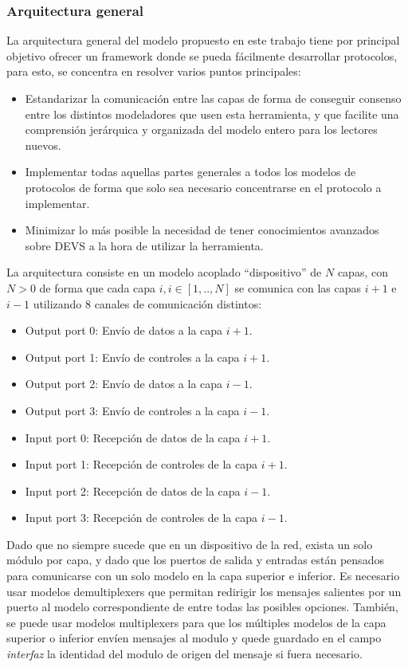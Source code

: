 \documentclass[10pt,a4paper]{article}
\begin{document}
\subsubsection{Arquitectura general}

La arquitectura general del modelo propuesto en este trabajo tiene por principal objetivo ofrecer un framework donde se pueda fácilmente desarrollar protocolos, para esto, se concentra en resolver varios puntos principales:

\begin{itemize}
\item Estandarizar la comunicación entre las capas de forma de conseguir consenso entre los distintos modeladores que usen esta herramienta, y que facilite una comprensión jerárquica y organizada del modelo entero para los lectores nuevos.
\item Implementar todas aquellas partes generales a todos los modelos de protocolos de forma que solo sea necesario concentrarse en el protocolo a implementar.
\item Minimizar lo más posible la necesidad de tener conocimientos avanzados sobre DEVS a la hora de utilizar la herramienta.
\end{itemize}

La arquitectura consiste en un modelo acoplado ``dispositivo'' de $N$ capas, con $N > 0$ de forma que cada capa $i, i \in [1,..,N]$ se comunica con las capas $i+1$ e $i-1$ utilizando $8$ canales de comunicación distintos:

\begin{itemize}
\item Output port 0: Envío de datos a la capa $i+1$.
\item Output port 1: Envío de controles a la capa $i+1$.
\item Output port 2: Envío de datos a la capa $i-1$.
\item Output port 3: Envío de controles a la capa $i-1$.
\item Input port 0: Recepción de datos de la capa $i+1$.
\item Input port 1: Recepción de controles de la capa $i+1$.
\item Input port 2: Recepción de datos de la capa $i-1$.
\item Input port 3: Recepción de controles de la capa $i-1$.
\end{itemize}

Dado que no siempre sucede que en un dispositivo de la red, exista un solo módulo por capa, y dado que los puertos de salida y entradas están pensados para comunicarse con un solo modelo en la capa superior e inferior. Es necesario usar modelos demultiplexers que permitan redirigir los mensajes salientes por un puerto al modelo correspondiente de entre todas las posibles opciones. También, se puede usar modelos multiplexers para que los múltiples modelos de la capa superior o inferior envíen mensajes al modulo y quede guardado en el campo \textit{interfaz} la identidad del modulo de origen del mensaje si fuera necesario. \\
\end{document}
